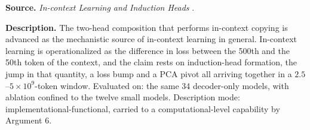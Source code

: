 
\textbf{Source.} \emph{In-context Learning and Induction Heads} \citep{olsson2022context}.

\textbf{Description.} The two-head composition that performs in-context copying is advanced as the mechanistic source of in-context learning in general. In-context learning is operationalized as the difference in loss between the 500th and the 50th token of the context, and the claim rests on induction-head formation, the jump in that quantity, a loss bump and a PCA pivot all arriving together in a $2.5$--$5\times10^{9}$-token window. Evaluated on: the same 34 decoder-only models, with ablation confined to the twelve small models. Description mode: implementational-functional, carried to a computational-level capability by Argument 6.

